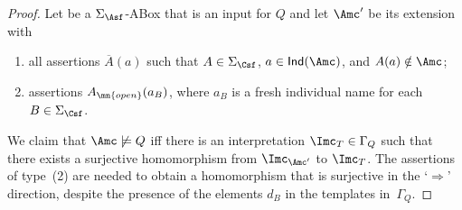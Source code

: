 \documentclass{lmcs}
\theoremstyle{definition}
\begin{document}
%
\begin{proof}
  Let \Amc be a $\Sigma_{\Asf}$-ABox that is an input for $Q$ and let 
  $\Amc'$ be its extension with
  \begin{enumerate}

  \item all assertions $\overline{A}(a)$ such that $A \in
    \Sigma_{\Csf}$, $a\in {\sf Ind}(\Amc)$, and $A(a) \notin \Amc$;

  \item assertions $A_{\mn{open}}(a_B)$, where $a_{B}$ is a fresh individual name
   for each $B \in \Sigma_{\Csf}$.

  \end{enumerate}
  We claim that $\Amc \not\models Q$ iff there is an interpretation
  $\Imc_T \in \Gamma_{Q}$ such that there exists a surjective
  homomorphism from $\Imc_{\Amc'}$ to $\Imc_T$. The assertions of
  type~(2) are needed to obtain a homomorphism that is surjective in
  the `$\Rightarrow$' direction, despite the presence of the elements
  $d_B$ in the templates in~$\Gamma_Q$.
  


\end{proof}
\end{document}
